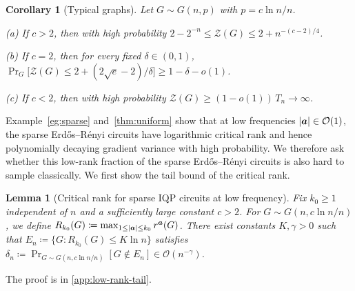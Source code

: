 \documentclass{article}
\theoremstyle{plain}
\newtheorem{lemma}[theorem]{Lemma}
\newtheorem{corollary}[theorem]{Corollary}
\theoremstyle{definition}
\theoremstyle{remark}
\begin{document}
\begin{corollary}[Typical graphs]\label{cor:erm-typical}
Let $G\sim G(n,p)$ with $p=c\ln n/n$.

\noindent\textup{(a)} If $c>2$, then with high probability $2-2^{-n}\le\mathcal Z(G)\le2+n^{-(c-2)/4}$.

\noindent\textup{(b)} If $c=2$, then for every fixed $\delta\in(0,1)$, $\Pr_G\big[\mathcal Z(G)\le2+(2\sqrt e-2)/\delta\big]\ge1-\delta-o(1)$.

\noindent\textup{(c)} If $c<2$, then with high probability $\mathcal Z(G)\ge(1-o(1))\,T_n\to\infty$.
\end{corollary}

Example~\ref{eg:sparse} and~\cref{thm:uniform} show that at low frequencies $\abs{{\bm{a}}}\in\mathcal{O}(1)$, the sparse Erd\H{o}s--R\'enyi circuits have logarithmic critical rank and hence polynomially decaying gradient variance with high probability. We therefore ask whether this low-rank fraction of the sparse Erd\H{o}s--R\'enyi circuits is also hard to sample classically. We first show the tail bound of the critical rank.
\begin{lemma}[Critical rank for sparse IQP circuits at low frequency] \label{lemma:low-rank-tail}
Fix $k_0 \geq 1$ independent of $n$ and a sufficiently large constant
$c>2$. For $G\sim G(n,c\ln n/n)$, we define $R_{k_0}(G) \coloneqq \max_{1\leq\abs{{\bm{a}}}\leq k_0}r^{{\bm{a}}}(G)$.
There exist constants $K,\gamma>0$ such that $E_n \coloneqq \{G \colon R_{k_0}(G)\leq K\ln n\}$ satisfies $\delta_n \coloneqq\Pr_{G\sim G(n,c\ln n/n)}[G\notin E_n] \in \mathcal{O}(n^{-\gamma})$.
\end{lemma}
The proof is in \cref{app:low-rank-tail}.
\end{document}
